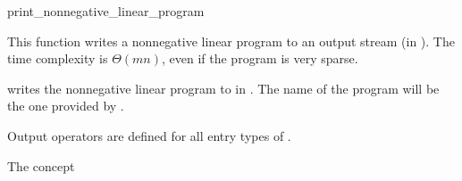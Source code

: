 \begin{ccRefFunction}{print_nonnegative_linear_program}


This function writes a nonnegative linear program to an output stream
(in ). The time
complexity is $\Theta (mn)$, even if the program is very sparse.

{writes the nonnegative linear program  to  in 
. The name of the program will be the one provided 
by .}

Output operators are defined for all entry types of .

\ccExample
{}

\ccSeeAlso

The concept


\end{ccRefFunction}
